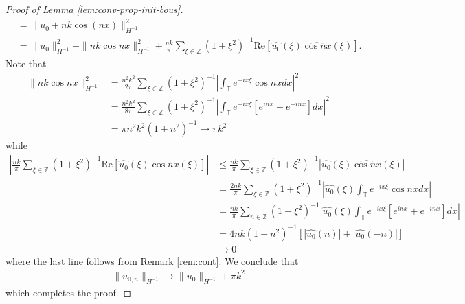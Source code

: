 \documentclass[12pt,reqno]{amsart}
\numberwithin{equation}{section}  %
\newcommand{\zz}{\mathbb{Z}}
\newcommand{\ci}{\mathbb{T}}
\newcommand{\wh}{\widehat}
\begin{document}
\begin{proof}[Proof of Lemma \ref{lem:conv-prop-init-bous}]
\begin{equation*}
\begin{split}
  & = 
  \|u_{0} + nk \cos(nx) \|_{H^{-1}}^{2}
  \\
  &= \| u_{0} \|^{2}_{H^{-1}} + \| nk \cos nx \|^{2}_{H^{-1}} + \frac{nk}{\pi}
  \sum_{\xi \in \zz} (1 + \xi^{2})^{-1} \text{Re}[\wh{u_{0}}(\xi) \wh{\cos
  nx}(\xi)].
\end{split}
\end{equation*}
%
%
Note that
%
%
\begin{equation*}
\begin{split}
  \| nk \cos nx \|_{H^{-1}}^{2} 
  & = \frac{n^{2} k^{2}}{2 \pi} \sum_{\xi \in \zz} (1 + \xi^{2})^{-1} | \int_{\ci}
  e^{-ix \xi} \cos nx dx |^{2}
  \\
  & = \frac{n^{2}k^{2}}{8 \pi} \sum_{\xi \in \zz} (1 + \xi^{2})^{-1} |
  \int_{\ci} e^{-ix \xi} [e^{inx} + e^{-inx}] dx |^{2}
  \\
  & = \pi n^{2} k^{2} (1 + n^{2})^{-1} \to \pi k^{2}
\end{split}
\end{equation*}
%
%
while
%
%
\begin{equation*}
\begin{split}
  | \frac{nk}{\pi}
  \sum_{\xi \in \zz} (1 + \xi^{2})^{-1} \text{Re}[\wh{u_{0}}(\xi) \wh{\cos
  nx}(\xi)] |
  & \le \frac{nk}{\pi} \sum_{\xi \in \zz} (1 + \xi^{2})^{-1} | \wh{u_{0}}(\xi) \wh{\cos
  nx}(\xi) |
  \\
  & = \frac{2nk}{\pi} \sum_{\xi \in \zz} (1 + \xi^{2})^{-1} |\wh{u_{0}}(\xi)  \int_{\ci}
  e^{-ix \xi} \cos nx dx |
  \\
  & = \frac{nk}{\pi} \sum_{n \in \zz} (1 + \xi^{2})^{-1} | \wh{u_{0}}(\xi)  \int_{\ci}
  e^{-ix \xi} [e^{inx} + e^{-inx}]dx|
  \\
  & = 4 nk (1 + n^{2})^{-1} [| \wh{u_{0}}(n) |  + | \wh{u_{0}}(-n) | ] 
  \\
  & \to 0
\end{split}
\end{equation*}
%
%
where the last line follows from Remark \ref{rem:cont}.
We conclude that
%
%
\begin{equation*}
\begin{split}
  \| u_{0,n} \|_{H^{-1}} \to \| u_{0} \|_{H^{-1}} + \pi k^{2}
\end{split}
\end{equation*}
%
%
%
which completes the proof.
%
%
%
%
\end{proof}
\end{document}
